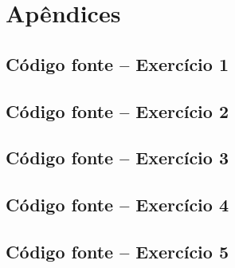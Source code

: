 \thispagestyle{plain}
\section*{Apêndices}

\subsection*{Código fonte -- Exercício 1}


\clearpage

\subsection*{Código fonte -- Exercício 2}


\clearpage

\subsection*{Código fonte -- Exercício 3}


\clearpage

\subsection*{Código fonte -- Exercício 4}


\clearpage

\subsection*{Código fonte -- Exercício 5}

